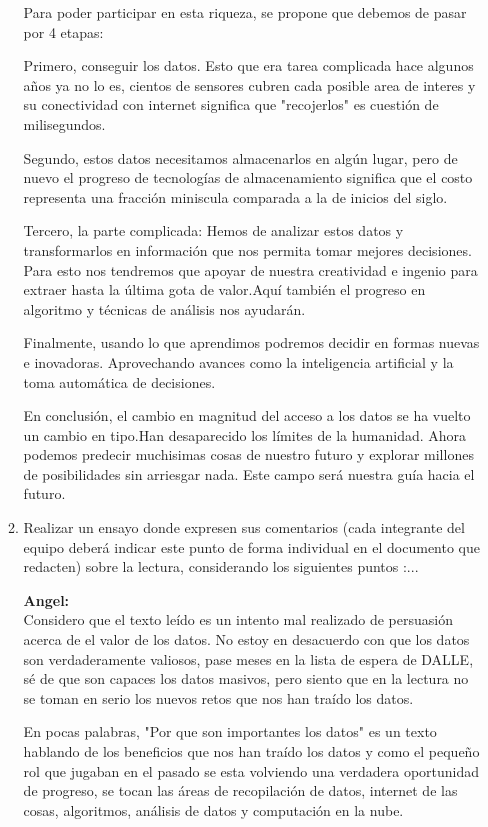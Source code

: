 \documentclass[12pt,a4paper]{article}
\begin{document}
\begin{enumerate}
\begin{enumerate}
				Para poder participar en esta riqueza,
				se propone que debemos de pasar por 4 etapas:

				Primero, conseguir los datos.
				Esto que era tarea complicada hace algunos años
				ya no lo es, cientos de sensores cubren cada
				posible area de interes y su conectividad con internet significa
				que "recojerlos" es cuestión de milisegundos.

				Segundo, estos datos necesitamos
				almacenarlos en algún lugar, pero de nuevo el progreso de
				tecnologías de almacenamiento significa que
				el costo representa una fracción miniscula comparada
				a la de inicios del siglo.

				Tercero, la parte complicada:
				Hemos de analizar estos datos y transformarlos en información
				que nos permita tomar mejores decisiones. Para esto
				nos tendremos que apoyar de nuestra creatividad e ingenio
				para extraer hasta la última gota de valor.Aquí
				también el progreso en algoritmo y técnicas de análisis
				nos ayudarán.

				Finalmente, usando lo que aprendimos podremos
				decidir en formas nuevas e inovadoras.
				Aprovechando avances como la inteligencia
				artificial y la toma automática de decisiones.

				En conclusión,
				el cambio en magnitud del acceso a los datos
				se ha vuelto un cambio en tipo.Han desaparecido
				los límites de la humanidad. Ahora podemos
				predecir muchisimas cosas de nuestro futuro
				y explorar millones de posibilidades sin arriesgar
				nada. Este campo será nuestra guía hacia el futuro.

			\item Realizar un ensayo donde expresen sus comentarios (cada integrante del equipo deberá indicar este
				punto de forma individual en el documento que redacten) sobre la lectura, considerando los siguientes puntos :...

				\textbf{Angel:}\\
				Considero que el texto leído es un intento mal realizado de
				persuasión acerca de el valor de los datos.
				No estoy en desacuerdo con que los datos son verdaderamente
				valiosos, pase meses en la lista de espera de DALLE, sé
				de que son capaces los datos masivos, pero siento que
				en la lectura no se toman en serio los nuevos retos
				que nos han traído los datos.

				En pocas palabras, "Por que son importantes los datos"
				es un texto hablando de los beneficios que nos han traído los
				datos y como el pequeño rol que jugaban en el pasado
				se esta volviendo una verdadera oportunidad de progreso,
				se tocan las áreas de recopilación de datos, internet de las cosas,
				algoritmos, análisis de datos y computación en la nube. 


\end{enumerate}
\end{enumerate}
\end{document}
